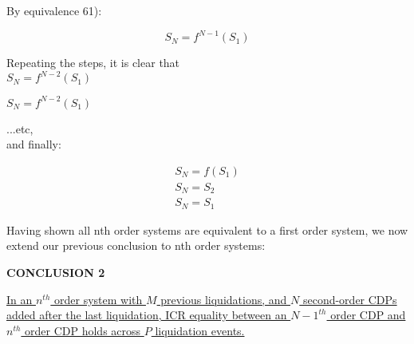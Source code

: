 \documentclass[reqno]{article}
\begin{document}
\bigskip
By equivalence 61):

\begin{equation} 
    S_N=f^{N-1}(S_1)
\end{equation}

\bigskip
Repeating the steps, it is clear that\\

$S_N=f^{N-2}(S_1)$

$S_N=f^{N-2}(S_1)$

...etc, \\

and finally:

\begin{equation}
    \begin{split}
        S_N=f(S_1)\\
        S_N=S_2\\
        S_N=S_1
    \end{split}
\end{equation}

\bigskip
Having shown all nth order systems are equivalent to a first order system, we now extend our previous conclusion to nth order systems:

\bigskip
\textbf{CONCLUSION 2}

\uline{In an $n^{th}$ order system with $M$ previous liquidations, and $N$ second-order CDPs added after the last liquidation, ICR equality between an $N-1^{th}$ order CDP and $n^{th}$ order CDP holds across $P$ liquidation events.}
\end{document}
